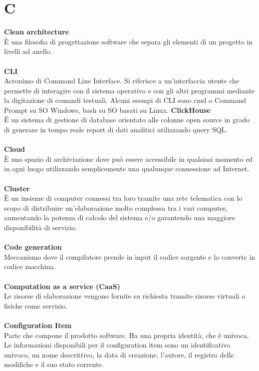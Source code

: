 \section{C}
\textbf{Clean architecture}\\
È una filosofia di progettazione software che separa gli elementi di un progetto in livelli ad anello. \\ \\
\textbf{CLI}\\
Acronimo di Command Line Interface. Si riferisce a un'interfaccia utente che permette di interagire con il sistema operativo e con gli altri programmi mediante la digitazione di comandi testuali. Alcuni esempi di CLI sono cmd o Command Prompt su SO Windows, bash su SO basati su Linux.
\textbf{ClickHouse}\\
È un sistema di gestione di database orientato alle colonne open source in grado di generare in tempo reale report di dati analitici utilizzando query SQL. \\ \\
\textbf{Cloud}\\
È uno spazio di archiviazione dove può essere accessibile in qualsiasi momento ed in ogni luogo utilizzando semplicemente una qualunque connessione ad Internet. \\ \\
\textbf{Cluster}\\
È un insieme di computer connessi tra loro tramite una rete telematica con lo scopo di distribuire un'elaborazione molto complessa tra i vari computer, aumentando la potenza di calcolo del sistema e/o garantendo una maggiore disponibilità di servizio. \\ \\
\textbf{Code generation}\\
Meccanismo dove il compilatore prende in input il codice sorgente e lo converte in codice macchina. \\ \\
\textbf{Computation as a service (CaaS)}\\
Le risorse di elaborazione vengono fornite su richiesta tramite risorse virtuali o fisiche come servizio. \\ \\
\textbf{Configuration Item}\\
Parte che compone il prodotto software. Ha una propria identità, che è univoca. Le informazioni disponibili per il configuration item sono un identificativo univoco, un nome descrittivo, la data di creazione, l'autore, il registro delle modifiche e il suo stato corrente.\\ \\
